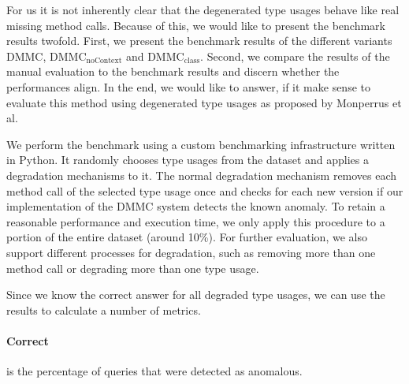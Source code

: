 For us it is not inherently clear that the degenerated type usages behave like real missing method calls.
Because of this, we would like to present the benchmark results twofold.
First, we present the benchmark results of the different variants $\text{DMMC}$, $\text{DMMC}_\text{noContext}$ and $\text{DMMC}_\text{class}$.
Second, we compare the results of the manual evaluation to the benchmark results and discern whether the performances align.
In the end, we would like to answer, if it make sense to evaluate this method using degenerated type usages as proposed by Monperrus et al.



We perform the benchmark using a custom benchmarking infrastructure written in Python.
It randomly chooses type usages from the dataset and applies a degradation mechanisms to it.
The normal degradation mechanism removes each method call of the selected type usage once and checks for each new version if our implementation of the $\text{DMMC}$ system detects the known anomaly.
To retain a reasonable performance and execution time, we only apply this procedure to a portion of the entire dataset (around 10\%).
For further evaluation, we also support different processes for degradation, such as removing more than one method call or degrading more than one type usage.

Since we know the correct answer for all degraded type usages, we can use the results to calculate a number of metrics.
\paragraph{Correct} is the percentage of queries that were detected as anomalous.

